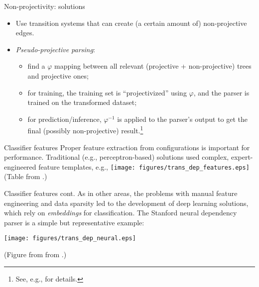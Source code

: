 \documentclass[style=upen, size=14pt]{powerdot}
\newcommand{\gold}{\color{arany}}
\theoremstyle{definition}
\begin{document}
\begin{slide}[toc=]{Non-projectivity: solutions}
  \begin{itemize}
  \item Use transition systems that can create (a certain amount of)
    non-projective edges.
  \item \emph{\gold Pseudo-projective parsing}:
    \begin{itemize}
    \item find a $\varphi$ mapping between all relevant (projective +
      non-projective) trees and projective ones;
    \item for training, the training set is ``projectivized'' using $\varphi$,
      and the parser is trained on the transformed dataset;
    \item for prediction/inference, $\varphi^{-1}$ is applied to the parser's
      output to get the final (possibly non-projective) result.\footnote{See,
        e.g., \cite{nivre-nilsson-2005-pseudo} for details.}
    \end{itemize}
  \end{itemize}
\end{slide}

\begin{slide}[toc=Features]{Classifier features}
  Proper feature extraction from configurations is important for performance.
  Traditional (e.g., perceptron-based) solutions used complex, expert-engineered
  feature templates, e.g.,
  \texttt{[image: figures/trans\_dep\_features.eps]}\\
  \footnotesize{\hspace{3.4cm}(Table from \cite{huang2009bilingually}.)}
\end{slide}

\begin{slide}[toc=]{Classifier features cont.}
  As in other areas, the problems with manual feature engineering and data
  sparsity led to the development of deep learning solutions, which rely on
  \emph{embeddings} for classification. The Stanford neural dependency parser is
  a simple but representative example:
  \begin{center}
    \texttt{[image: figures/trans\_dep\_neural.eps]}
    
    \footnotesize{(Figure from  from \cite{chen2014fast}.)}
  \end{center}
\end{slide}
\end{document}
